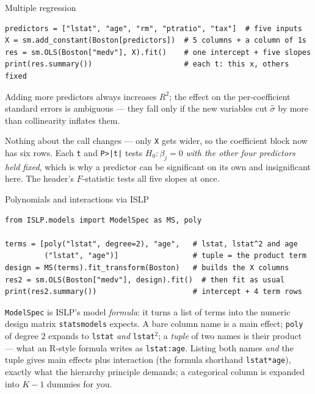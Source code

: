 \documentclass[aspectratio=169,11pt]{beamer}
\begin{document}
\begin{frame}[fragile]{Multiple regression}
  \begin{lstlisting}
predictors = ["lstat", "age", "rm", "ptratio", "tax"]  # five inputs
X = sm.add_constant(Boston[predictors])  # 5 columns + a column of 1s
res = sm.OLS(Boston["medv"], X).fit()    # one intercept + five slopes
print(res.summary())                     # each t: this x, others fixed
  \end{lstlisting}
  Adding more predictors always increases $R^2$; the effect on the
  per-coefficient standard errors is ambiguous --- they fall only if the new
  variables cut $\hat\sigma$ by more than collinearity inflates them.
  \begin{readme}\footnotesize
    Nothing about the call changes --- only \texttt{X} gets wider, so the
    coefficient block now has six rows. Each \texttt{t} and
    \texttt{P>|t|} tests $H_0:\beta_j=0$ \emph{with the other four
    predictors held fixed}, which is why a predictor can be significant on
    its own and insignificant here. The header's $F$-statistic tests all
    five slopes at once.
  \end{readme}
\end{frame}

\begin{frame}[fragile]{Polynomials and interactions via ISLP}
  \begin{lstlisting}
from ISLP.models import ModelSpec as MS, poly

terms = [poly("lstat", degree=2), "age",   # lstat, lstat^2 and age
         ("lstat", "age")]                 # tuple = the product term
design = MS(terms).fit_transform(Boston)   # builds the X columns
res2 = sm.OLS(Boston["medv"], design).fit()  # then fit as usual
print(res2.summary())                      # intercept + 4 term rows
  \end{lstlisting}
  \begin{readme}\footnotesize
    \texttt{ModelSpec} is ISLP's model \emph{formula}: it turns a list of
    terms into the numeric design matrix \texttt{statsmodels} expects.
    A bare column name is a main effect; \texttt{poly} of degree $2$
    expands to \texttt{lstat} \emph{and} \texttt{lstat}$^2$; a
    \emph{tuple} of two names is their product --- what an R-style formula
    writes as \texttt{lstat:age}. Listing both names \emph{and} the tuple
    gives main effects plus interaction (the formula shorthand
    \texttt{lstat*age}), exactly what the hierarchy principle demands; a
    categorical column is expanded into $K-1$ dummies for you.
  \end{readme}
\end{frame}
\end{document}
